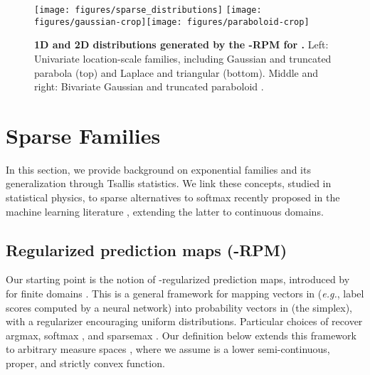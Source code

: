 \documentclass{article}
\newcommand{\remove}[1]{}
\begin{document}
\begin{figure*}[t]
\centering
\texttt{[image: figures/sparse\_distributions]}\quad
\texttt{[image: figures/gaussian-crop]}\texttt{[image: figures/paraboloid-crop]}\caption{{\bf 1D and 2D distributions generated by the -RPM for .} Left: Univariate location-scale families, including Gaussian and truncated parabola (top) and Laplace and triangular (bottom). Middle and right: Bivariate Gaussian  and truncated paraboloid . \label{fig:gaussian_paraboloid}}
\end{figure*}

\remove{
\begin{figure*}[t]
\centering \texttt{[image: figures/sparse\_distributions]}
\caption{{\bf Location-scale families with different -Tsallis regularizations.} Left: Gaussian and truncated parabola distributions with zero mean and different variances. Middle: same for Laplace and triangular distributions. Right: Distributions  for varying . \label{fig:gaussian_laplacian_distributions}}
\end{figure*}
}


\section{Sparse Families}\label{sec:sparse_families}

In this section, we provide background on exponential families and its generalization through Tsallis statistics. We link these concepts, studied in statistical physics, 
to sparse alternatives to softmax recently 
proposed in the machine learning literature \citep{Martins2016ICML,peters2019sparse}, extending 
the latter to continuous domains. 

\subsection{Regularized prediction maps (-RPM)}

Our starting point is the notion of -regularized prediction maps, introduced by \citet{blondel2020learning} for finite domains . 
This is a general framework for mapping vectors in  (\textit{e.g.}, label scores computed by a neural network) into probability vectors in  (the simplex), with a regularizer  encouraging uniform distributions. Particular choices of  recover argmax, softmax \citep{bridle1990probabilistic}, and sparsemax \citep{Martins2016ICML}. Our definition below extends this framework to arbitrary measure spaces , where we assume   is a lower semi-continuous,  proper, and strictly convex function.
\end{document}
